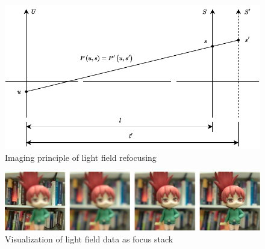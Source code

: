 \begin{figure}[b]
	\centering
	\includegraphics[width=0.90\linewidth]{figures/chapter2/re_focus}
	{Imaging principle of light field refocusing}  
	\label{chpt2:fig:refocus}
\end{figure}









\begin{figure}[b]
	\centering
	\includegraphics[width=0.95\linewidth]{figures/chapter2/focal_stack}
	{Visualization of light field data as focus stack}  
	\label{cpt2_fig7:focal_stack}
\end{figure}









